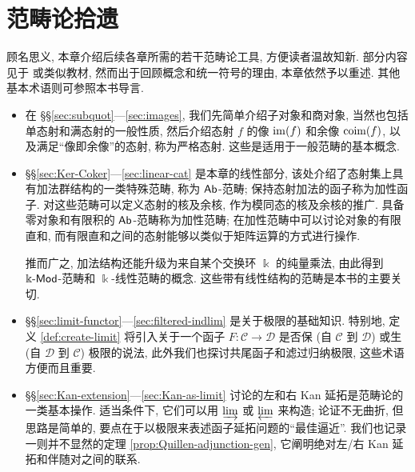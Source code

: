 
\chapter{范畴论拾遗}\label{sec:categories}
顾名思义, 本章介绍后续各章所需的若干范畴论工具, 方便读者温故知新. 部分内容见于 \cite{Li1} 或类似教材, 然而出于回顾概念和统一符号的理由, 本章依然予以重述. 其他基本术语则可参照本书导言.

\begin{itemize}
	\item 在 \S\S\ref{sec:subquot}---\ref{sec:images}, 我们先简单介绍子对象和商对象, 当然也包括单态射和满态射的一般性质, 然后介绍态射 $f$ 的像 $\operatorname{im}(f)$ 和余像 $\operatorname{coim}(f)$, 以及满足``像即余像''的态射, 称为严格态射. 这些是适用于一般范畴的基本概念.
	\item \S\S\ref{sec:Ker-Coker}---\ref{sec:linear-cat} 是本章的线性部分, 该处介绍了态射集上具有加法群结构的一类特殊范畴, 称为 $\mathsf{Ab}$-范畴; 保持态射加法的函子称为加性函子. 对这些范畴可以定义态射的核及余核, 作为模同态的核及余核的推广. 具备零对象和有限积的 $\mathsf{Ab}$-范畴称为加性范畴; 在加性范畴中可以讨论对象的有限直和, 而有限直和之间的态射能够以类似于矩阵运算的方式进行操作.
	
	推而广之, 加法结构还能升级为来自某个交换环 $\Bbbk$ 的纯量乘法, 由此得到 $\Bbbk\text{-}\mathsf{Mod}$-范畴和 $\Bbbk$-线性范畴的概念. 这些带有线性结构的范畴是本书的主要关切.
	
	\item \S\S\ref{sec:limit-functor}---\ref{sec:filtered-indlim} 是关于极限的基础知识. 特别地, 定义 \ref{def:create-limit} 将引入关于一个函子 $F: \mathcal{C} \to \mathcal{D}$ 是否保 (自 $\mathcal{C}$ 到 $\mathcal{D}$) 或生 (自 $\mathcal{D}$ 到 $\mathcal{C}$) 极限的说法, 此外我们也探讨共尾函子和滤过归纳极限, 这些术语方便而且重要.
	
	\item \S\S\ref{sec:Kan-extension}---\ref{sec:Kan-as-limit} 讨论的左和右 Kan 延拓是范畴论的一类基本操作. 适当条件下, 它们可以用 $\varinjlim$ 或 $\varprojlim$ 来构造; 论证不无曲折, 但思路是简单的, 要点在于以极限来表述函子延拓问题的``最佳逼近''. 我们也记录一则并不显然的定理 \ref{prop:Quillen-adjunction-gen}, 它阐明绝对左/右 Kan 延拓和伴随对之间的联系.


\end{itemize}
